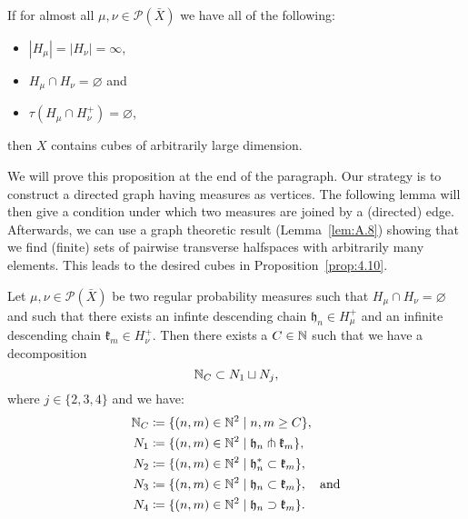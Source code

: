 \begin{prop}[{\cite[Proposition~4.10]{MR3509968}}]
  \label{prop:4.10}
  If for almost all \(\mu, \nu \in \mathcal{P}(\bar X)\) we have all of the following:
  \begin{itemize}
  \item \(|H_\mu| = |H_\nu| = \infty\),
  \item \(H_\mu \cap H_\nu = \varnothing\) and
  \item \(\tau(H_\mu \cap H_\nu^+) = \varnothing\),
  \end{itemize}
  then \(X\) contains cubes of arbitrarily large dimension.
\end{prop}

We will prove this proposition at the end of the paragraph. Our strategy is to construct a directed graph having measures as vertices. The following lemma will then give a condition under which two measures are joined by a (directed) edge. Afterwards, we can use a graph theoretic result (Lemma~\ref{lem:A.8}) showing that we find (finite) sets of pairwise transverse halfspaces with arbitrarily many elements. This leads to the desired cubes in Proposition~\ref{prop:4.10}.


\begin{lemma}
  \label{lem:sep-n}
  Let \(\mu, \nu \in \mathcal{P}(\bar X)\) be two regular probability measures such that \(H_\mu \cap H_\nu = \varnothing\) and such that there exists an infinte descending chain \(\mathfrak{h}_n\in H_\mu^+\) and an infinite descending chain \(\mathfrak{k}_m \in H_\nu^+\). Then there exists a \(C \in \mathbb{N}\) such that we have a decomposition
  \[
    \mathbb{N}_C \subset N_1 \sqcup N_j,
  \]
  where \(j \in \{2,3,4\}\) and  we have:
  \begin{align*}
    \mathbb{N}_C & \coloneqq \{(n,m) \in \mathbb{N}^2 \mid n,m \geq C\},\\
    N_1 & \coloneqq \{(n,m) \in \mathbb{N}^2 \mid \mathfrak{h}_n \pitchfork \mathfrak{k}_m\},\\
    N_2 & \coloneqq \{(n,m) \in \mathbb{N}^2 \mid \mathfrak{h}_n^\ast \subset \mathfrak{k}_m\},\\
    N_3 & \coloneqq \{(n,m) \in \mathbb{N}^2 \mid \mathfrak{h}_n \subset \mathfrak{k}_m\},\quad \text{and}\\
    N_4 & \coloneqq \{(n,m) \in \mathbb{N}^2 \mid \mathfrak{h}_n \supset \mathfrak{k}_m\}.
  \end{align*}
\end{lemma}

